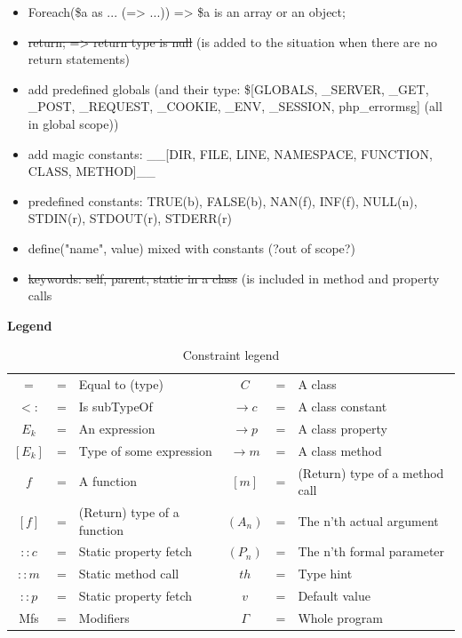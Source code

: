 \documentclass[../main.tex]{subfiles}
\begin{document}
\begin{itemize}
        \item Foreach(\$a as ... (=> ...)) => \$a is an array or an object;
        \item \sout{return; => return type is null} (is added to the situation when there are no return statements)
        \item add predefined globals (and their type: \$[GLOBALS, \_SERVER, \_GET, \_POST, \_REQUEST, \_COOKIE, \_ENV, \_SESSION, php\_errormsg] (all in global scope))
        \item add magic constants: \_\_[DIR, FILE, LINE, NAMESPACE, FUNCTION, CLASS, METHOD]\_\_
        \item predefined constants: TRUE(b), FALSE(b), NAN(f), INF(f), NULL(n), STDIN(r), STDOUT(r), STDERR(r) 
        \item define("name", value) mixed with constants (?out of scope?)
        \item \sout{keywords: self, parent, static in a class} (is included in method and property calls

        
        
    \end{itemize}

    \hrulefill
    
    \textbf{Legend} \\
    \begin{table}[H]
        \begin{tabular}{ c c l c c l }
            $=$     & = & Equal to (type) &
            $C$     & = & A class \\
            $<:$    & = & Is subTypeOf &
            $\rightarrow c$     & = & A class constant \\
            $E_k$   & = & An expression &
            $\rightarrow p$     & = & A class property \\
            $[E_k]$ & = & Type of some expression &
            $\rightarrow m$     & = & A class method \\
            $f$     & = & A function &
            $[m]$   & = & (Return) type of a method call \\
            $[f]$   & = & (Return) type of a function &
            $(A_n)$ & = & The n'th actual argument \\
            $::c$   & = & Static property fetch &
            $(P_n)$ & = & The n'th formal parameter \\
            $::m$   & = & Static method call &
            $th$    & = & Type hint \\
            $::p$   & = & Static property fetch &
            $v$     & = & Default value \\
            Mfs     & = & Modifiers &
            $\Gamma$ & = & Whole program 
            
            
        \end{tabular}
        \caption{Constraint legend}
        \label{table:constraintLegend}
    \end{table}
    
\end{document}
